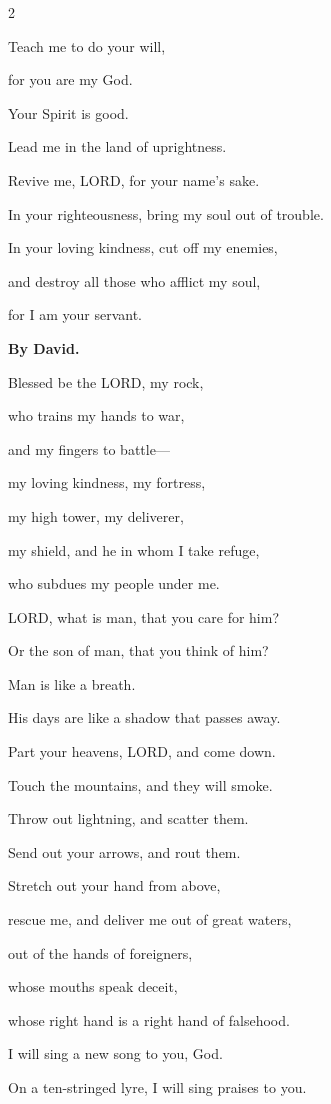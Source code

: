 \begin{multicols}{2}
	
	\myverse{}Teach me to do your will,
	
	for you are my God.
	
	Your Spirit is good.
	
	Lead me in the land of uprightness.
	
	
	\myverse{}Revive me, LORD, for your name’s sake.
	
	In your righteousness, bring my soul out of trouble.
	
	
	\myverse{}In your loving kindness, cut off my enemies,
	
	and destroy all those who afflict my soul,
	
	for I am your servant.
	
	
	\mychapter{}\textbf{By David.}
	
	\quad\quad\quad \myverse*{}Blessed be the LORD, my rock,
	
	who trains my hands to war,
	
	and my fingers to battle---
	
	
	\myverse{}my loving kindness, my fortress,
	
	my high tower, my deliverer,
	
	my shield, and he in whom I take refuge,
	
	who subdues my people under me.
	
	
	\myverse{}LORD, what is man, that you care for him?
	
	Or the son of man, that you think of him?
	
	
	\myverse{}Man is like a breath.
	
	His days are like a shadow that passes away.
	
	
	\myverse{}Part your heavens, LORD, and come down.
	
	Touch the mountains, and they will smoke.
	
	
	\myverse{}Throw out lightning, and scatter them.
	
	Send out your arrows, and rout them.
	
	
	\myverse{}Stretch out your hand from above,
	
	rescue me, and deliver me out of great waters,
	
	out of the hands of foreigners,
	
	
	\myverse{}whose mouths speak deceit,
	
	whose right hand is a right hand of falsehood.
	
	
	\myverse{}I will sing a new song to you, God.
	
	On a ten-stringed lyre, I will sing praises to you.
	

\end{multicols}
